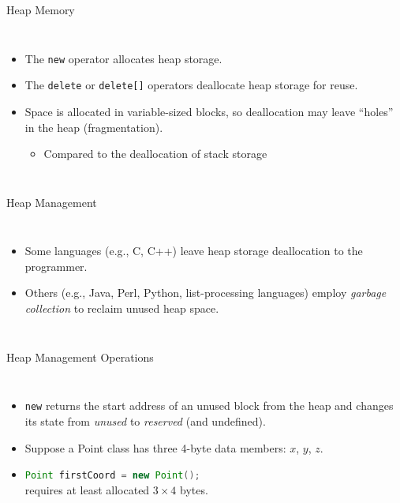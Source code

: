 \documentclass[14pt,aspectratio=1610]{beamer}
\begin{document}
\begin{frame}[fragile]{Heap Memory}
\begin{columns}
  \begin{itemize}
  \item
    The \lstinline{new} operator allocates heap storage.
  \item
    The \lstinline{delete} or \lstinline{delete[]} operators deallocate heap storage for reuse.
  \item
    Space is allocated in variable-sized blocks, so deallocation may leave
    ``holes'' in the heap (fragmentation).

    \begin{itemize}
    \item
      Compared to the deallocation of stack storage
    \end{itemize}
  \end{itemize}

  \vspace{1.5em}
  
\end{columns}
\end{frame}

\begin{frame}[fragile]{Heap Management}
\begin{columns}
  \begin{itemize}[<+->]
  \item
    Some languages (e.g., C, C++) leave heap storage deallocation to the
    programmer.
  \item
    Others (e.g., Java, Perl, Python, list-processing languages) employ
    \textit{garbage collection} to reclaim unused heap space.
  \end{itemize}
  \vspace{1.5em}
  
\end{columns}
\end{frame}

\begin{frame}{Heap Management Operations}
\begin{columns}
  \begin{itemize}[<+->]
  \item
    \lstinline{new} returns the start address of an unused block from the heap and changes its state from \textit{unused} to \textit{reserved} (and undefined).
  \item
    Suppose a Point class has three 4-byte data members: \(x\), \(y\), \(z\).\\
  \item
    \lstinline[language=Java]{Point firstCoord = new Point();}\\
    requires at least allocated \(3 \times 4\) bytes.
  \end{itemize}
  \vspace{1.5em}
  
\end{columns}
\end{frame}
\end{document}
